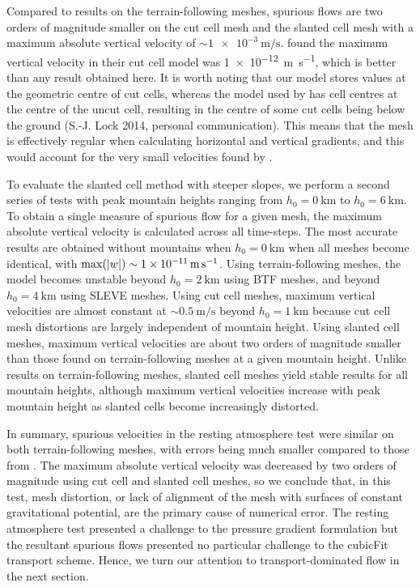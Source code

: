 Compared to results on the terrain-following meshes, spurious flows are two orders of magnitude smaller on the cut cell mesh and the slanted cell mesh with a maximum absolute vertical velocity of $\sim \SI{1e-3}{\meter\per\second}$.
\citet{good2014} found the maximum vertical velocity in their cut cell model was \SI{1e-12}{\meter\per\second}, which is better than any result obtained here.  It is worth noting that our model stores values at the geometric centre of cut cells, whereas the model used by \citet{good2014} has cell centres at the centre of the uncut cell, resulting in the centre of some cut cells being below the ground (S.-J. Lock 2014, personal communication).
This means that the mesh is effectively regular when calculating horizontal and vertical gradients, and this would account for the very small velocities found by \citet{good2014}.

To evaluate the slanted cell method with steeper slopes, we perform a second series of tests with peak mountain heights ranging from $h_0 = \SI{0}{\kilo\meter}$ to $h_0 = \SI{6}{\kilo\meter}$.
To obtain a single measure of spurious flow for a given mesh, the maximum absolute vertical velocity is calculated across all time-steps.
The most accurate results are obtained without mountains when $h_0 = \SI{0}{\kilo\meter}$ when all meshes become identical, with $\max(\left\lvert w \right\rvert) \sim \SI{1e-11}{\meter\per\second}$.
Using terrain-following meshes, the model becomes unstable beyond $h_0 = \SI{2}{\kilo\meter}$ using BTF meshes, and beyond $h_0 = \SI{4}{\kilo\meter}$ using SLEVE meshes.
Using cut cell meshes, maximum vertical velocities are almost constant at $\sim \SI{0.5}{\meter\per\second}$ beyond $h_0 = \SI{1}{\kilo\meter}$ because cut cell mesh distortions are largely independent of mountain height.
Using slanted cell meshes, maximum vertical velocities are about two orders of magnitude smaller than those found on terrain-following meshes at a given mountain height.  Unlike results on terrain-following meshes, slanted cell meshes yield stable results for all mountain heights, although maximum vertical velocities increase with peak mountain height as slanted cells become increasingly distorted.

In summary, spurious velocities in the resting atmosphere test were similar on both terrain-following meshes, with errors being much smaller compared to those from \citet{klemp2011}.
The maximum absolute vertical velocity was decreased by two orders of magnitude using cut cell and slanted cell meshes, so we conclude that, in this test, mesh distortion, or lack of alignment of the mesh with surfaces of constant gravitational potential, are the primary cause of numerical error.
The resting atmosphere test presented a challenge to the pressure gradient formulation but the resultant spurious flows presented no particular challenge to the cubicFit transport scheme.  Hence, we turn our attention to transport-dominated flow in the next section.
